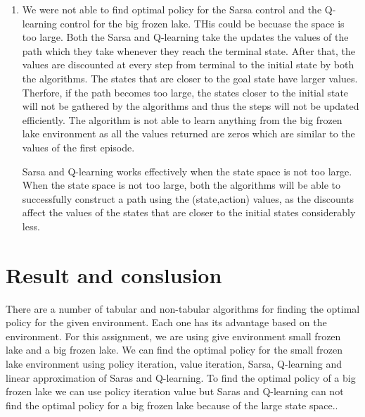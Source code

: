 \documentclass[11pt]{article}
\begin{document}
\begin{enumerate}
		\item We were not able to find optimal policy for the Sarsa control and the Q-learning control for the big frozen lake. THis could be becuase the space is too large. Both the Sarsa and Q-learning take the updates the values of the path which they take whenever they reach the terminal state. After that, the values are discounted at every step from terminal to the initial state by both the algorithms. The states that are closer to the goal state have larger values. Therfore, if the path becomes too large, the states closer to the initial state will not be gathered by the algorithms and thus the steps will not be updated efficiently. The algorithm is not able to learn anything from the big frozen lake environment as all the values returned are zeros which are similar to the values of the first episode. \par
		
		Sarsa and Q-learning works effectively when the state space is not too large. When the state space is not too large, both the algorithms will be able to successfully construct a path using the (state,action) values, as the discounts affect the values of the states that are closer to the initial states considerably less.
	\end{enumerate}
\section{Result and conslusion}
There are a number of tabular and non-tabular algorithms for finding the optimal policy for the given environment. Each one has its advantage based on the environment.  For this assignment, we are using give environment small frozen lake and a big frozen lake. We can find the optimal policy for the small frozen lake environment using policy iteration, value iteration, Sarsa, Q-learning and linear approximation of Saras and Q-learning. To find the optimal policy of a big frozen lake we can use policy iteration value but Saras and Q-learning can not find the optimal policy for a big frozen lake because of the large state space.. 
\end{document}
